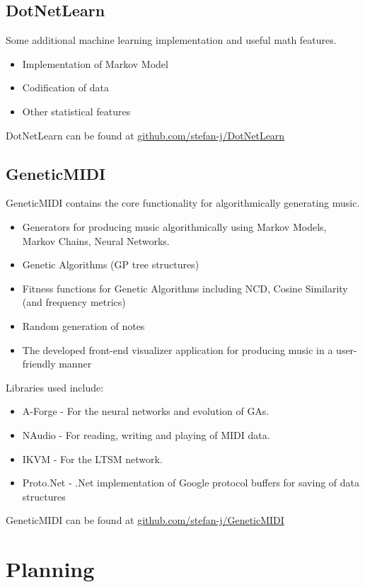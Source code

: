 \section{DotNetLearn}
Some additional machine learning implementation and useful math features.
\begin{itemize}
\item Implementation of Markov Model
\item Codification of data
\item Other statistical features
\end{itemize}
DotNetLearn can be found at \href{https://github.com/stefan-j/DotNetLearn}{github.com/stefan-j/DotNetLearn}

\section{GeneticMIDI}
GeneticMIDI contains the core functionality for algorithmically generating music.
\begin{itemize}
\item Generators for producing music algorithmically using Markov Models, Markov Chains, Neural Networks.
\item Genetic Algorithms (\ac{GP} tree structures)
\item Fitness functions for Genetic Algorithms including \ac{NCD}, Cosine Similarity (and frequency metrics)
\item Random generation of notes
\item The developed front-end visualizer application for producing music in a user-friendly manner
\end{itemize}

Libraries used include:
\begin{itemize}
\item A-Forge - For the neural networks and evolution of \acp{GA}.
\item NAudio - For reading, writing and playing of \ac{MIDI} data. 
\item IKVM - For the \ac{LTSM} network.
\item Proto.Net - .Net implementation of Google protocol buffers for saving of data structures
\end{itemize}

GeneticMIDI can be found at \href{https://github.com/stefan-j/GeneticMIDI}{github.com/stefan-j/GeneticMIDI}

\chapter{Planning}

